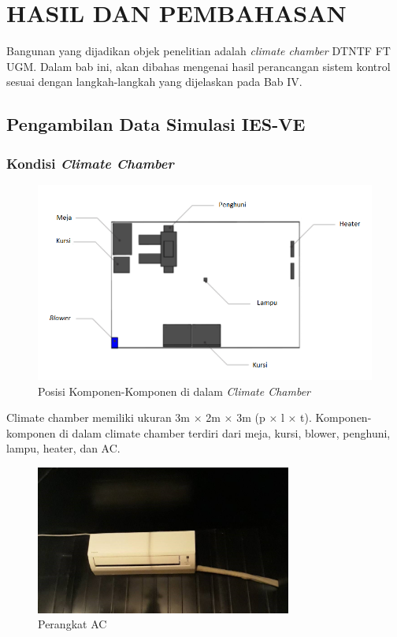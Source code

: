 \chapter{HASIL DAN PEMBAHASAN}
\label{hasil-dan-pembahasan}
Bangunan yang dijadikan objek penelitian adalah \textit{climate chamber} DTNTF FT UGM. Dalam bab ini, akan dibahas mengenai hasil perancangan sistem kontrol sesuai dengan langkah-langkah yang dijelaskan pada Bab IV.

\section{Pengambilan Data Simulasi IES-VE}

\subsection{Kondisi \textit{Climate Chamber}}

\begin{figure}[!h]
	\centering
	\includegraphics[width=1\textwidth]{figures/KondisiChamber}
	\caption{Posisi Komponen-Komponen di dalam \textit{Climate Chamber}}
	\label{fig:5:KondisiChamber}
\end{figure}

Climate chamber memiliki ukuran 3m $\times$ 2m $\times$ 3m (p $\times$ l $\times$ t). Komponen-komponen di dalam climate chamber terdiri dari meja, kursi, blower, penghuni, lampu, heater, dan AC.\\

\begin{figure}[!h]
	\centering
	\includegraphics[width=0.75\textwidth]{figures/AC}
	\caption{Perangkat AC}
	\label{fig:5:AC}
\end{figure}

